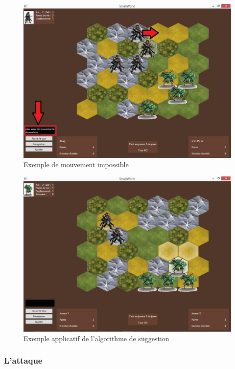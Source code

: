 \newpage
\begin{figure}[ht!]
\centering
\includegraphics[scale=0.35]{img/exmovimp.jpg}
\caption{Exemple de mouvement impossible}
\end{figure}

\begin{figure}[ht!]
\centering
\includegraphics[scale=0.40]{img/algo.jpg}
\caption{Exemple applicatif de l'algorithme de suggestion}
\end{figure}

\newpage
\subsubsection{L'attaque}

